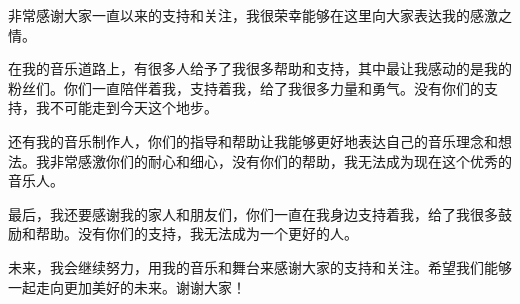 \documentclass[UTF8,zihao=-4]{oucart}
\begin{document}
非常感谢大家一直以来的支持和关注，我很荣幸能够在这里向大家表达我的感激之情。

在我的音乐道路上，有很多人给予了我很多帮助和支持，其中最让我感动的是我的粉丝们。你们一直陪伴着我，支持着我，给了我很多力量和勇气。没有你们的支持，我不可能走到今天这个地步。

还有我的音乐制作人，你们的指导和帮助让我能够更好地表达自己的音乐理念和想法。我非常感激你们的耐心和细心，没有你们的帮助，我无法成为现在这个优秀的音乐人。

最后，我还要感谢我的家人和朋友们，你们一直在我身边支持着我，给了我很多鼓励和帮助。没有你们的支持，我无法成为一个更好的人。

未来，我会继续努力，用我的音乐和舞台来感谢大家的支持和关注。希望我们能够一起走向更加美好的未来。谢谢大家！
\end{document}
